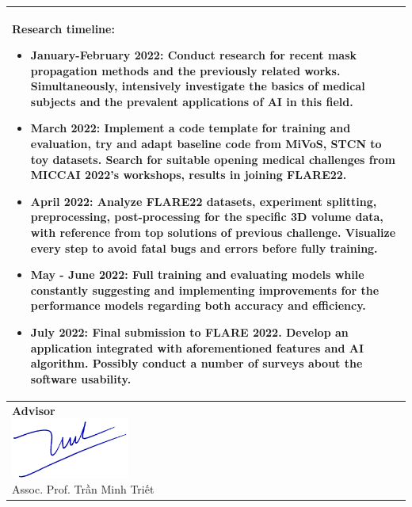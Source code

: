 \begin{longtable}{|p{{{80mm}}}|c|}
\multicolumn{2}{|m{\linewidth}|}{
\textbf{Research timeline}:
\vspace{-4mm}
\begin{itemize}
\item \textbf{January-February 2022}: Conduct research for recent mask propagation methods and the previously related works. Simultaneously, intensively investigate the basics of medical subjects and the prevalent applications of AI in this field.
\vspace{-4mm}
\item \textbf{March 2022}: Implement a code template for training and evaluation, try and adapt baseline code from MiVoS, STCN to toy datasets. Search for suitable opening medical challenges from MICCAI 2022’s workshops, results in joining FLARE22.
\vspace{-4mm}
\item \textbf{April 2022}: Analyze FLARE22 datasets, experiment splitting, preprocessing, post-processing for the specific 3D volume data, with reference from top solutions of previous challenge. Visualize every step to avoid fatal bugs and errors before fully training.
\vspace{-4mm}
\item \textbf{May - June 2022}: Full training and evaluating models while constantly suggesting and implementing improvements for the performance models regarding both accuracy and efficiency.
\vspace{-4mm}
\item \textbf{July 2022}: Final submission to FLARE 2022. Develop an application integrated with aforementioned features and AI algorithm. Possibly conduct a number of surveys about the software usability.
\vspace{-4mm}
\end{itemize}
}\\
\hline

\makecell[c]{\textbf{Advisor} \\ 
\includegraphics[height=2cm]{resources/signatures/tmtriet.png} \\ Assoc. Prof. Trần Minh Triết } & 


\end{longtable}
